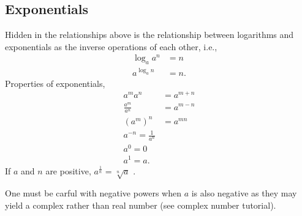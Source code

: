 \documentclass[final,a4paper,12pt]{article}
\theoremstyle{definition}
\begin{document}
\subsection{Exponentials}
Hidden in the relationships above is the relationship between logarithms and
exponentials as the inverse operations of each other, i.e.,
\begin{align*}
    \log_a a^n &= n \\
    a^{\log_a n} & = n .
\end{align*}
Properties of exponentials,
\begin{align*}
    a^m a^n &= a^{m + n} \\
    \frac{a^m}{a^n} &= a^{m - n} \\
    (a^m)^n &= a^{mn} \\
    a^{-n} = \frac{1}{a^{n}} \\
    a^0 = 0 \\
    a^1 = a .
\end{align*}
If $a$ and $n$ are positive, $a^{\frac{1}{n}} = \sqrt[n]{a}$ .

One must be carful with negative powers when $a$ is also negative as they may
yield a complex rather than real number (see complex number tutorial).
\end{document}
